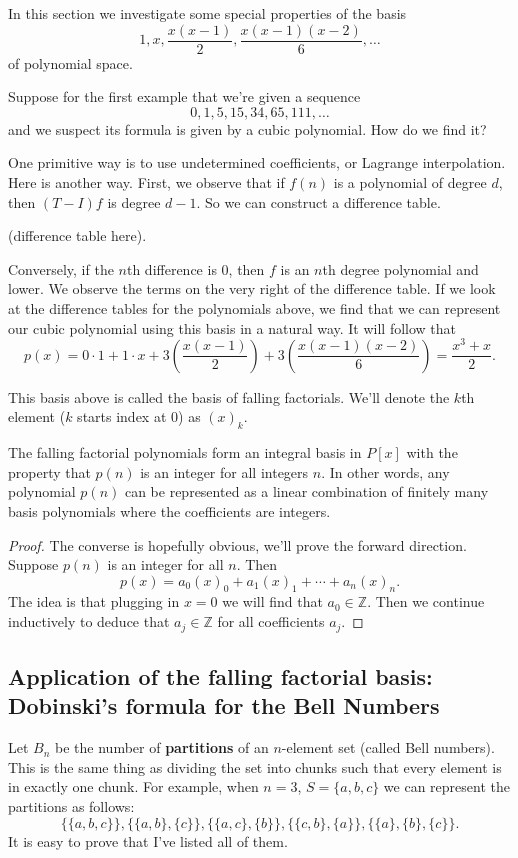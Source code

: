In this section we investigate some special properties of the basis
\[1, x, \frac{x(x-1)}{2}, \frac{x(x-1)(x-2)}{6}, \dots\] of polynomial space.

Suppose for the first example that we're given a sequence
\[0, 1, 5, 15, 34, 65, 111, \dots\] and we suspect its formula is given by a cubic polynomial. How do we find it?

One primitive way is to use undetermined coefficients, or Lagrange interpolation. Here is another way. First, we observe that if $f(n)$ is a polynomial of degree $d$, then $(T - I)f$ is degree $d - 1$. So we can construct a difference table.

(difference table here).

Conversely, if the $n$th difference is $0$, then $f$ is an $n$th degree polynomial and lower. We observe the terms on the very right of the difference table. If we look at the difference tables for the polynomials above, we find that we can represent our cubic polynomial using this basis in a natural way. It will follow that
\[p(x) = 0\cdot 1 + 1 \cdot x + 3\left(\frac{x(x-1)}{2}\right) + 3\left(\frac{x(x-1)(x-2)}{6}\right) = \frac{x^3 + x}{2}.\]

This basis above is called the basis of falling factorials. We'll denote the $k$th element ($k$ starts index at $0$) as $(x)_k$.

The falling factorial polynomials form an integral basis in $P[x]$ with the property that $p(n)$ is an integer for all integers $n$. In other words, any polynomial $p(n)$ can be represented as a linear combination of finitely many basis polynomials where the coefficients are integers.

\begin{proof}
The converse is hopefully obvious, we'll prove the forward direction. Suppose $p(n)$ is an integer for all $n$. Then 
\[p(x) = a_0(x)_0 + a_1(x)_1 + \cdots + a_n(x)_n.\]
The idea is that plugging in $x = 0$ we will find that $a_0 \in \mathbb{Z}$. Then we continue inductively to deduce that $a_j \in \mathbb{Z}$ for all coefficients $a_j$.
\end{proof}

\subsection{Application of the falling factorial basis: Dobinski's formula for the Bell Numbers}

Let $B_n$ be the number of \textbf{partitions} of an $n$-element set (called Bell numbers). This is the same thing as dividing the set into chunks such that every element is in exactly one chunk. For example, when $n = 3$, $S = \{a,b,c\}$ we can represent the partitions as follows:
\[\{\{a,b,c\}\}, \{\{a,b\},\{c\}\}, \{\{a,c\},\{b\}\}, \{\{c,b\},\{a\}\}, \{\{a\},\{b\},\{c\}\}.\]
It is easy to prove that I've listed all of them.

